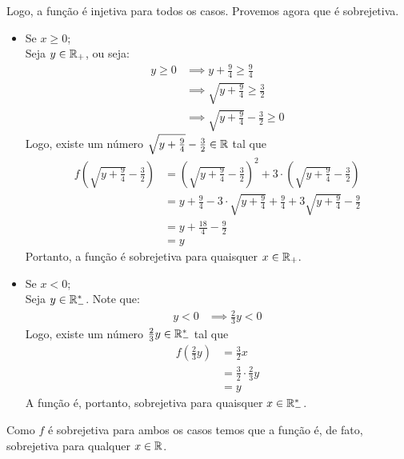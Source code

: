 Logo, a função é injetiva para todos os casos. Provemos agora que é sobrejetiva.
\begin{itemize}
    \item Se $x \ge 0$; \\
    Seja $y \in \mathbb R_+$, ou seja:
    \begin{align*}
        y \ge 0 & \implies y + \frac{9}{4} \ge \frac{9}{4} \\ & \implies
        \sqrt{y + \frac{9}{4}} \ge \frac{3}{2} \\ & \implies 
        \sqrt{y + \frac{9}{4}} - \frac{3}{2} \ge 0
    \end{align*} 
    Logo, existe um número $\sqrt{y + \frac{9}{4}} - \frac{3}{2} \in \mathbb R$ tal que
    \begin{align*}
        f(\sqrt{y + \frac{9}{4}} - \frac{3}{2}) & = (\sqrt{y + \frac{9}{4}} - \frac{3}{2})^2 + 3 \cdot (\sqrt{y + \frac{9}{4}} - \frac{3}{2}) \\ & =
        y + \frac{9}{4} - 3 \cdot \sqrt{y + \frac{9}{4}} + \frac{9}{4} + 3\sqrt{y + \frac{9}{4}} - \frac{9}{2} \\ & =
        y + \frac{18}{4} - \frac{9}{2} \\ & =
        y
    \end{align*}  
    Portanto, a função é sobrejetiva para quaisquer $x \in \mathbb R_+$.  
    \item Se $x < 0$; \\
    Seja $y \in \mathbb R_-^*$. Note que:
    \begin{align*}
        y < 0 & \implies \frac{2}{3}y < 0
    \end{align*}
    Logo, existe um número $\frac{2}{3}y \in \mathbb R_-^*$ tal que
    \begin{align*}
        f(\frac{2}{3}y) & = \frac{3}{2}x \\ &= \frac{3}{2} \cdot \frac{2}{3}y \\ & = y
    \end{align*}
    A função é, portanto, sobrejetiva para quaisquer $x \in \mathbb R_-^*$.
\end{itemize}
Como $f$ é sobrejetiva para ambos os casos temos que a função é, de fato, sobrejetiva para qualquer $x \in \mathbb R$.
